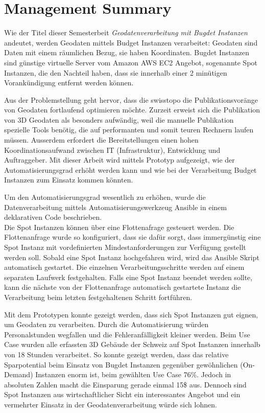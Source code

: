 \section{Management Summary}
Wie der Titel dieser Semesterbeit \emph{Geodatenverarbeitung mit Bugdet Instanzen} andeutet, werden Geodaten mittels Budget Instanzen verarbeitet: Geodaten sind Daten mit einem räumlichen Bezug, sie haben Koordinaten. Bugdet Instanzen sind günstige virtuelle Server vom Amazon AWS EC2 Angebot, sogenannte Spot Instanzen, die den Nachteil haben, dass sie innerhalb einer 2 minütigen Vorankündigung entfernt werden können.

Aus der Problemstellung geht hervor, dass die swisstopo die Publikationsvoränge von Geodaten fortlaufend optimieren möchte. Zurzeit erweist sich die Publikation von 3D Geodaten als besonders aufwändig, weil die manuelle Publikation spezielle Tools benötig, die auf performanten und somit teuren Rechnern laufen müssen. Ausserdem erfordert die Bereitstellungen einen hohen Koordinationsaufwand zwischen IT (Infrastruktur), Entwicklung und Auftraggeber.
Mit dieser Arbeit wird mittels Prototyp aufgezeigt, wie der Automatisierungsgrad erhöht werden kann und wie bei der Verarbeitung Budget Instanzen zum Einsatz kommen könnten.

Um den Automatisierungsgrad wesentlich zu erhöhen, wurde die Datenverarbeitung mittels Automatisierungswerkzeug Ansible in einem deklarativen Code beschrieben.\\ Die Spot Instanzen können über eine Flottenafrage gesteuert werden. Die Flottenanfrage wurde so konfiguriert, dass sie dafür sorgt, dass immergünstig eine Spot Instanz mit vordefinierten Mindestanforderungen zur Verfügung gestellt werden soll. Sobald eine Spot Instanz hochgefahren wird, wird das Ansible Skript automatisch gestartet.
Die einzelnen Verarbeitungsschritte werden auf einem separaten Laufwerk festgehalten. Falls eine Spot Instanz beendet werden sollte, kann die nächste von der Flottenanfrage automatisch gestartete Instanz die Verarbeitung beim letzten festgehaltenen Schritt fortführen.

Mit dem Prototypen konnte gezeigt werden, dass sich Spot Instanzen gut eignen, um Geodaten zu verarbeiten. Durch die Automatisierung würden Personalstunden wegfallen und die Fehleranfälligkeit kleiner werden. Beim Use Case wurden alle erfassten 3D Gebäude der Schweiz auf Spot Instanzen innerhalb von 18 Stunden verarbeitet.
So konnte gezeigt werden, dass das relative Sparpotential beim Einsatz von Bugdet Instanzen gegenüber gewöhnlichen (On-Demand) Instanzen enorm ist, beim gewählten Use Case 76\%. Jedoch in absoluten Zahlen macht die Einsparung gerade einmal 15\$ aus. Dennoch sind Spot Instanzen aus wirtschaftlicher Sicht ein interessantes Angebot und ein vermehrter Einsatz in der Geodatenverarbeitung würde sich lohnen.

\pagebreak